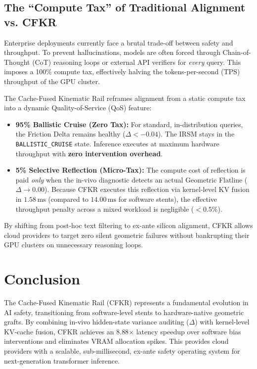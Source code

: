 \documentclass[11pt,twocolumn]{article}
\begin{document}
\begin{enumerate}
\subsection{The ``Compute Tax'' of Traditional Alignment vs. CFKR}
Enterprise deployments currently face a brutal trade-off between safety and throughput. To prevent hallucinations, models are often forced through Chain-of-Thought (CoT) reasoning loops or external API verifiers for \textit{every} query. This imposes a 100\% compute tax, effectively halving the tokens-per-second (TPS) throughput of the GPU cluster.

The Cache-Fused Kinematic Rail reframes alignment from a static compute tax into a dynamic Quality-of-Service (QoS) feature:
\begin{itemize}
    \item \textbf{95\% Ballistic Cruise (Zero Tax):} For standard, in-distribution queries, the Friction Delta remains healthy ($\Delta < -0.04$). The IRSM stays in the \texttt{BALLISTIC\_CRUISE} state. Inference executes at maximum hardware throughput with \textbf{zero intervention overhead}.
    \item \textbf{5\% Selective Reflection (Micro-Tax):} The compute cost of reflection is paid \textit{only} when the in-vivo diagnostic detects an actual Geometric Flatline ($\Delta \to 0.00$). Because CFKR executes this reflection via kernel-level KV fusion in $1.58\,\text{ms}$ (compared to $14.00\,\text{ms}$ for software stents), the effective throughput penalty across a mixed workload is negligible ($< 0.5\%$).
\end{itemize}
By shifting from post-hoc text filtering to ex-ante silicon alignment, CFKR allows cloud providers to target zero silent geometric failures without bankrupting their GPU clusters on unnecessary reasoning loops.

\section{Conclusion}
The Cache-Fused Kinematic Rail (CFKR) represents a fundamental evolution in AI safety, transitioning from software-level stents to hardware-native geometric grafts. By combining in-vivo hidden-state variance auditing ($\Delta$) with kernel-level KV-cache fusion, CFKR achieves an 8.88$\times$ latency speedup over software bias interventions and eliminates VRAM allocation spikes. This provides cloud providers with a scalable, sub-millisecond, ex-ante safety operating system for next-generation transformer inference.


\end{enumerate}
\end{document}
